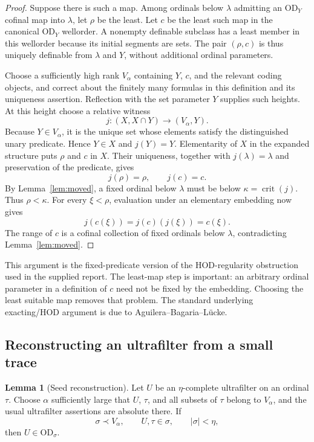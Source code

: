 \documentclass[11pt,letterpaper]{article}
\theoremstyle{definition}
\newtheorem{lemma}[definition]{Lemma}
\newcommand{\OD}{\mathrm{OD}}
\newcommand{\crit}{\operatorname{crit}}
\theoremstyle{remark}
\begin{document}
\begin{proof}
Suppose there is such a map. Among ordinals below $\lambda$ admitting an $\OD_Y$ cofinal map into $\lambda$, let $\rho$ be the least. Let $c$ be the least such map in the canonical $\OD_Y$ wellorder. A nonempty definable subclass has a least member in this wellorder because its initial segments are sets. The pair $(\rho,c)$ is thus uniquely definable from $\lambda$ and $Y$, without additional ordinal parameters.

Choose a sufficiently high rank $V_\alpha$ containing $Y$, $c$, and the relevant coding objects, and correct about the finitely many formulas in this definition and its uniqueness assertion. Reflection with the set parameter $Y$ supplies such heights. At this height choose a relative witness
\[
 j:(X,X\cap Y)\longrightarrow(V_\alpha,Y).
\]
Because $Y\in V_\alpha$, it is the unique set whose elements satisfy the distinguished unary predicate. Hence $Y\in X$ and $j(Y)=Y$. Elementarity of $X$ in the expanded structure puts $\rho$ and $c$ in $X$. Their uniqueness, together with $j(\lambda)=\lambda$ and preservation of the predicate, gives
\[
 j(\rho)=\rho,\qquad j(c)=c.
\]
By Lemma~\ref{lem:moved}, a fixed ordinal below $\lambda$ must be below $\kappa=\crit(j)$. Thus $\rho<\kappa$. For every $\xi<\rho$, evaluation under an elementary embedding now gives
\[
 j(c(\xi))=j(c)(j(\xi))=c(\xi).
\]
The range of $c$ is a cofinal collection of fixed ordinals below $\lambda$, contradicting Lemma~\ref{lem:moved}.
\end{proof}

This argument is the fixed-predicate version of the HOD-regularity obstruction used in the supplied report. The least-map step is important: an arbitrary ordinal parameter in a definition of $c$ need not be fixed by the embedding. Choosing the least suitable map removes that problem. The standard underlying exacting/HOD argument is due to Aguilera--Bagaria--L\"ucke.\cite[Theorem 2.10]{abl}

\subsection{Reconstructing an ultrafilter from a small trace}

\begin{lemma}[Seed reconstruction]\label{lem:seed}
Let $U$ be an $\eta$-complete ultrafilter on an ordinal $\tau$. Choose $\alpha$ sufficiently large that $U$, $\tau$, and all subsets of $\tau$ belong to $V_\alpha$, and the usual ultrafilter assertions are absolute there. If
\[
 \sigma\prec V_\alpha,\qquad U,\tau\in\sigma,\qquad |\sigma|<\eta,
\]
then $U\in\OD_\sigma$.
\end{lemma}
\end{document}
